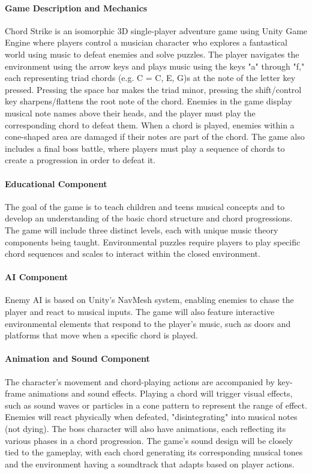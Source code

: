 \documentclass[11pt]{article}
\begin{document}
\maketitle
\paragraph*{Game Description and Mechanics}
Chord Strike is an isomorphic 3D single-player adventure game using Unity Game Engine 
where players control a musician character who explores a fantastical world using music 
to defeat enemies and solve puzzles. The player navigates the environment using the arrow 
keys and plays music using the keys "a" through "f," each representing triad chords 
(e.g. C = C, E, G)s at the note of the letter key pressed. Pressing the space bar makes 
the triad minor, pressing the shift/control key sharpens/flattens the root note of the 
chord. Enemies in the game display musical note names above their heads, and the player
must play the corresponding chord to defeat them. When a chord is played, enemies within 
a cone-shaped area are damaged if their notes are part of the chord. The game also includes 
a final boss battle, where players must play a sequence of chords to create a progression 
in order to defeat it.

\paragraph*{Educational Component}
The goal of the game is to teach children and teens musical concepts and to develop an 
understanding of the basic chord structure and chord progressions. The game will include 
three distinct levels, each with unique music theory components being taught. Environmental 
puzzles require players to play specific chord sequences and scales to interact within the 
closed environment. 

\paragraph*{AI Component}
Enemy AI is based on Unity's NavMesh system, enabling enemies to chase the player and 
react to musical inputs. The game will also feature interactive environmental elements 
that respond to the player's music, such as doors and platforms that move when a specific 
chord is played.

\paragraph*{Animation and Sound Component}
The character's movement and chord-playing actions are accompanied by key-frame animations 
and sound effects. Playing a chord will trigger visual effects, such as sound waves or 
particles in a cone pattern to represent the range of effect. Enemies will react physically 
when defeated, "disintegrating" into musical notes (not dying). The boss character will also 
have animations, each reflecting its various phases in a chord progression. The game's sound 
design will be closely tied to the gameplay, with each chord generating its corresponding 
musical tones and the environment having a soundtrack that adapts based on player actions.
\end{document}
